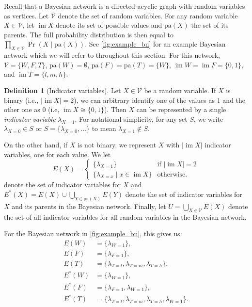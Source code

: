 \documentclass{article}
\theoremstyle{definition}
\newtheorem{definition}{Definition}
\theoremstyle{remark}
\DeclareMathOperator{\im}{im}
\begin{document}
{Recall that a Bayesian network is a directed acyclic graph with random variables
as vertices. Let $\mathcal{V}$ denote the set of random variables. For any
random variable $X \in \mathcal{V}$, let $\im X$ denote its set of possible
values and $\mathrm{pa}(X)$ the set of its parents. The full probability
distribution is then equal to $\prod_{X \in \mathcal{V}} \Pr(X \mid
\mathrm{pa}(X))$. See \cref{fig:example_bn} for an example Bayesian network
which we will refer to throughout this section. For this network, $\mathcal{V} =
\{ W, F, T \}$, $\mathrm{pa}(W) = \emptyset$, $\mathrm{pa}(F) = \mathrm{pa}(T) =
\{ W \}$, $\im W = \im F = \{0, 1 \}$, and $\im T = \{ l, m, h \}$.

\begin{definition}[Indicator variables]
  Let $X \in \mathcal{V}$ be a random variable. If $X$ is binary (i.e., $|\im X|
  = 2$), we can arbitrary identify one of the values as $1$ and the other one as
  $0$ (i.e, $\im X \cong \{ 0, 1 \}$). Then $X$ can be represented by a single
  \emph{indicator variable} $\lambda_{X=1}$. For notational simplicity, for any
  set $S$, we write $\lambda_{X=0} \in S$ or $S = \{ \lambda_{X=0}, \dots \}$ to
  mean $\lambda_{X=1} \not\in S$.

  On the other hand, if $X$ is not binary, we represent $X$ with $|\im X|$
  indicator variables, one for each value. We let
  \[
    E(X) = \begin{cases}
      \{ \lambda_{X=1} \} & \text{if } |\im X| = 2 \\
      \{ \lambda_{X=x} \mid x \in \im X \} & \text{otherwise.}
    \end{cases}
  \]
  denote the set of indicator variables for $X$ and $E^*(X) = E(X) \cup
  \bigcup_{Y \in \mathrm{pa}(X)} E(Y)$ denote the set of indicator variables for
  $X$ and its parents in the Bayesian network. Finally, let $U = \bigcup_{X \in
    \mathcal{V}} E(X)$ denote the set of all indicator variables for all random
  variables in the Bayesian network.
\end{definition}

For the Bayesian network in \cref{fig:example_bn}, this gives us:
\begin{align*}
  E(W) &= \{ \lambda_{W=1} \}, \\
  E(F) &= \{ \lambda_{F=1} \}, \\
  E(T) &= \{ \lambda_{T=l}, \lambda_{T=m}, \lambda_{T=h} \}, \\
  E^*(W) &= \{ \lambda_{W=1} \}, \\
  E^*(F) &= \{ \lambda_{F=1}, \lambda_{W=1} \}, \\
  E^*(T) &= \{ \lambda_{T=l}, \lambda_{T=m}, \lambda_{T=h}, \lambda_{W=1} \}.
\end{align*}

}
\end{document}
